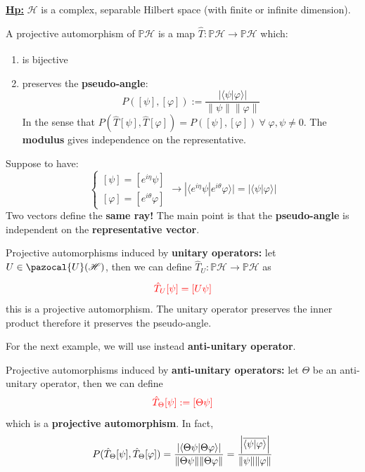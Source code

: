 \documentclass[../main.tex]{subfiles}
\begin{document}
\underline{\textbf{Hp:}} $\mathcal{H}$ is a complex, separable Hilbert space (with finite or infinite dimension).
\begin{definition}
A projective automorphism of $\mathbb{P}\mathcal{H}$ is a map $\hat{T}:\mathbb{P}\mathcal{H}\xrightarrow[]{}\mathbb{P}\mathcal{H}$ which:
\begin{enumerate}
    \item is bijective
    \item preserves the \textbf{pseudo-angle}:
    \[
    P([\psi],[\varphi]):=\frac{|\langle\psi|\varphi\rangle|}{\lVert\psi\rVert\lVert\varphi\rVert}
    \]
    In the sense that $P(\hat{T}[\psi],\hat{T}[\varphi])=P([\psi],[\varphi]) \ \forall\;\varphi,\psi\neq 0$. The \textbf{modulus} gives independence on the representative.
\end{enumerate}
\end{definition}
Suppose to have:
\[
\begin{cases}[\psi]=[e^{i\eta}\psi]\\
[\varphi]=[e^{i\theta}\varphi]
\end{cases}\xrightarrow[]{}|\langle e^{i\eta}\psi|e^{i\theta}\varphi\rangle|=|\langle\psi|\varphi\rangle|
\]
{\selectfont{}\relax}Two vectors define the \textbf{same ray!} The main point is that the \textbf{pseudo-angle} is independent on the \textbf{representative vector}.
\begin{example}
Projective automorphisms induced by \textbf{unitary operators:} let $U\in\pazocal{U}(\mathcal{H})$, then we can define $\hat{T}_U:\mathbb{P}\mathcal{H}\xrightarrow[]{}\mathbb{P}\mathcal{H}$ as \[
{\color{red}\hat{T}_U[\psi]=[U\psi]}
\]this is a projective automorphism. The unitary operator preserves the inner product therefore it preserves the pseudo-angle. 
\end{example}
For the next example, we will use instead \textbf{anti-unitary operator}.
\begin{example}Projective automorphisms induced by \textbf{anti-unitary operators:}
let $\Theta$ be an anti-unitary operator, then we can define \[
{\color{red}\hat{T}_{\Theta}[\psi]:=[\Theta\psi]}
\]which is a \textbf{projective automorphism}. In fact,
\[
P(\hat{T}_{\Theta}[\psi],\hat{T}_{\Theta}[\varphi])=\frac{\abs{\braket{\Theta\psi}{\Theta\varphi}}}{\norm{\Theta\psi}\norm{\Theta\varphi}}=\frac{\abs{\overline{\braket{\psi}{\varphi}}}}{\norm{\psi}\norm{\varphi}}
\]
\end{example}
\end{document}
